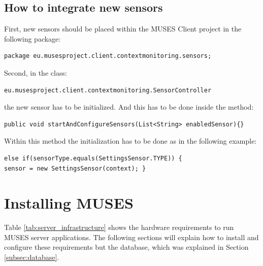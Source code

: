\section{How to integrate new sensors}
\label{sec:integratesensor}

First, new sensors should be placed within the MUSES Client project in the following package:
 
\begin{verbatim}
package eu.musesproject.client.contextmonitoring.sensors;
\end{verbatim}

Second, in the class:

\begin{verbatim}
eu.musesproject.client.contextmonitoring.SensorController
\end{verbatim}

the new sensor has to be initialized. And this has to be done inside the method: 

\begin{verbatim}
public void startAndConfigureSensors(List<String> enabledSensor){}
\end{verbatim}

Within this method the initialization has to be done as in the following example:

\begin{verbatim}
else if(sensorType.equals(SettingsSensor.TYPE)) {
sensor = new SettingsSensor(context); }
\end{verbatim}

\chapter{Installing MUSES}
\label{ch:installmuses}

Table \ref{tab:server_infrastructure} shows the hardware requirements to run MUSES server applications. The following sections will explain how to install and configure these requirements but the database, which was explained in Section \ref{subsec:database}.

